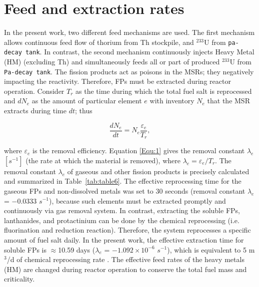 \section{Feed and extraction rates}
In the present work, two different feed mechanisms are used. The first 
mechanism allows continuous feed flow of thorium from Th stockpile, and 
$^{233}$U from \texttt{pa-decay tank}. In contrast, the second mechanism 
continuously injects Heavy Metal (HM) (excluding Th) and simultaneously feeds  
all or part of produced $^{233}$U from \texttt{Pa-decay tank}. The fission 
products act as poisons in the MSRs; they negatively impacting the reactivity. 
Therefore, \gls{FPs} must be extracted during reactor operation. Consider 
$T_{r}$ as the time during which the total fuel salt is reprocessed and 
$dN_{e}$ as the amount of particular element $e$ with inventory $N_{e}$ that 
the \gls{MSR} extracts during time $dt$; thus \cite{nuttin2005potential}

\begin{equation}
\label{Equ:1}
\dfrac{dN_{e}}{dt} = N_{e}\dfrac{\varepsilon_{e}}{T_{r}},	
\end{equation}

where $\varepsilon_{e}$ is the removal efficiency. Equation \ref{Equ:1} gives 
the removal constant $\lambda_{e}$ $[s^{-1}]$ (the rate at which the material 
is removed), where $\lambda_{e}=\varepsilon_{e}/T_{r}$. The removal constant 
$\lambda_{e}$ of gaseous and other fission products is precisely calculated 
and summarized in Table~\ref{tab:table6}. The effective reprocessing time for 
the gaseous \gls{FPs} and non-dissolved metals was set to 30 seconds (removal 
constant $\lambda_{e}$ = $-0.0333$ $s^{-1}$), because such elements must be 
extracted promptly and continuously via gas removal system. In contrast, 
extracting the soluble \gls{FPs}, lanthanides, and protactinium can be done by 
the chemical reprocessing (i.e. fluorination and reduction reaction). 
Therefore, the system reprocesses a specific amount of fuel salt daily. In the 
present work, the effective extraction time for soluble \gls{FPs} is 
$\approx$10.59 days ($\lambda_{e}$ = $-1.092\times10^{-6}$ $s^{-1}$), which is 
equivalent to 5 m$^3$/d of chemical reprocessing rate 
\cite{nuttin2005potential,li_optimization_2018}. The effective feed rates of 
the heavy metals (HM) are changed during reactor operation to conserve the 
total fuel mass and criticality.


